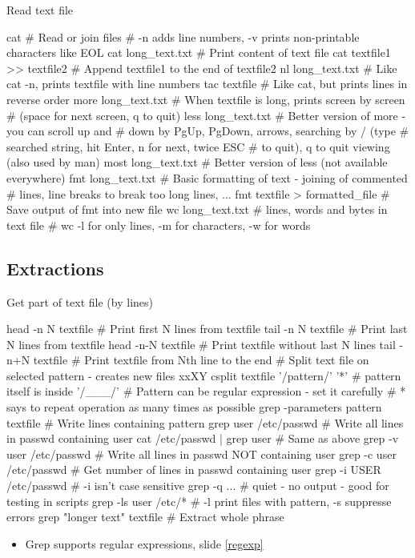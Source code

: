 \documentclass[compress, ucs, xelatex, 11pt, xcolor=svgnames,
  hyperref={
    bookmarks=true,
    unicode=true,
    colorlinks=true,
    pdftitle={Linux, command line and MetaCentrum},
    plainpages=false,
    pdfauthor={Vojtech Zeisek},
    pdfsubject={Course about use of Linux command line, writing shell scripts and using MetaCentrum of CESNET},
    pdfcreator={XeLaTeX},
    pdfkeywords={Linux, GNU, BASH, shell, command line, MetaCentrum},
    linkcolor=DarkRed,
    anchorcolor=DarkBlue,
    citecolor=Indigo,
    filecolor=NavyBlue,
    menucolor=DarkMagenta,
    urlcolor=DarkBlue,
    pdftex},
  url={hyphens, lowtilde} %
  ]{beamer}
\begin{document}
\begin{frame}[fragile]{Read text file}
  \begin{bashcode}
    cat # Read or join files
        # -n adds line numbers, -v prints non-printable characters like EOL
    cat long_text.txt # Print content of text file
    cat textfile1 >> textfile2 # Append textfile1 to the end of textfile2
    nl long_text.txt # Like cat -n, prints textfile with line numbers
    tac textfile # Like cat, but prints lines in reverse order
    more long_text.txt # When textfile is long, prints screen by screen
                       # (space for next screen, q to quit)
    less long_text.txt # Better version of more - you can scroll up and
                       # down by PgUp, PgDown, arrows, searching by / (type
                       # searched string, hit Enter, n for next, twice ESC
                       # to quit), q to quit viewing (also used by man)
    most long_text.txt # Better version of less (not available everywhere)
    fmt long_text.txt # Basic formatting of text - joining of commented
                      # lines, line breaks to break too long lines, ...
    fmt textfile > formatted_file # Save output of fmt into new file
    wc long_text.txt # lines, words and bytes in text file
                     # wc -l for only lines, -m for characters, -w for words
  \end{bashcode}
\end{frame}

\subsection{Extractions}

\begin{frame}[fragile]{Get part of text file (by lines)}
  \begin{bashcode}
    head -n N textfile # Print first N lines from textfile
    tail -n N textfile # Print last N lines from textfile
    head -n-N textfile # Print textfile without last N lines
    tail -n+N textfile # Print textfile from Nth line to the end
    # Split text file on selected pattern - creates new files xxXY
    csplit textfile '/pattern/' '{*}' # pattern itself is inside '/___/'
    # Pattern can be regular expression - set it carefully
    # {*} says to repeat operation as many times as possible
    grep -parameters pattern textfile # Write lines containing pattern
    grep user /etc/passwd # Write all lines in passwd containing user
    cat /etc/passwd | grep user # Same as above
    grep -v user /etc/passwd # Write all lines in passwd NOT containing user
    grep -c user /etc/passwd # Get number of lines in passwd containing user
    grep -i USER /etc/passwd # -i isn't case sensitive
    grep -q ... # quiet - no output - good for testing in scripts
    grep -ls user /etc/* # -l print files with pattern, -s suppresse errors
    grep "longer text" textfile # Extract whole phrase
  \end{bashcode}
  \begin{itemize}
    \item Grep supports regular expressions, slide \ref{regexp}
  \end{itemize}
\end{frame}
\end{document}
